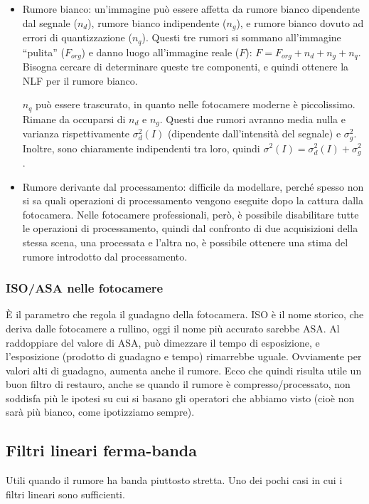 \documentclass[a4paper,11pt]{article}
\begin{document}
\begin{itemize}
    \item Rumore bianco: un'immagine può essere affetta da rumore bianco dipendente dal segnale ($n_d$), rumore bianco indipendente ($n_g$), e rumore
    bianco dovuto ad errori di quantizzazione ($n_q$). Questi tre rumori si sommano all'immagine ``pulita'' ($F_{org}$) e danno luogo all'immagine reale
    ($F$): $F = F_{org} + n_d + n_g + n_q$. Bisogna cercare di determinare queste tre componenti, e quindi ottenere la NLF per il rumore bianco.
    \par
    $n_q$ può essere trascurato, in quanto nelle fotocamere moderne è piccolissimo. Rimane da occuparsi di $n_d$ e $n_g$. Questi due rumori avranno media nulla e varianza rispettivamente
    $\sigma_d^2(I)$ (dipendente dall'intensità del segnale) e $\sigma_g^2$. Inoltre, sono chiaramente indipendenti tra loro, quindi $\sigma^2(I) = \sigma_d^2(I) + \sigma_g^2$.
    \item Rumore derivante dal processamento: difficile da modellare, perché spesso non si sa quali operazioni di processamento vengono eseguite dopo
    la cattura dalla fotocamera. Nelle fotocamere professionali, però, è possibile disabilitare tutte le operazioni di processamento, quindi dal
    confronto di due acquisizioni della stessa scena, una processata e l'altra no, è possibile ottenere una stima del rumore introdotto dal processamento.
\end{itemize}

\subsubsection{ISO/ASA nelle fotocamere}
È il parametro che regola il guadagno della fotocamera. ISO è il nome storico, che deriva dalle fotocamere a rullino, oggi il nome più accurato sarebbe
ASA. Al raddoppiare del valore di ASA, può dimezzare il tempo di esposizione, e l'esposizione (prodotto di guadagno e tempo) rimarrebbe uguale. Ovviamente per valori alti di guadagno, aumenta anche il rumore.
Ecco che quindi risulta utile un buon filtro di restauro, anche se quando il rumore è compresso/processato, non soddisfa più le ipotesi su cui si basano
gli operatori che abbiamo visto (cioè non sarà più bianco, come ipotizziamo sempre).

\subsection{Filtri lineari ferma-banda}
Utili quando il rumore ha banda piuttosto stretta. Uno dei pochi casi in cui i filtri lineari sono sufficienti.
\end{document}
